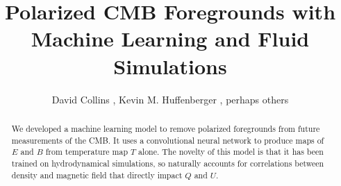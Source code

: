 \title{Polarized CMB Foregrounds with Machine Learning and Fluid Simulations}
\author{David Collins , Kevin M. Huffenberger
, perhaps others}



\begin{abstract}
    We developed a machine learning model to remove polarized foregrounds from
    future measurements of the CMB.  It uses a convolutional neural network to
    produce maps of $E$ and $B$ from temperature map $T$ alone.  The novelty of this model is that it has
    been trained on hydrodynamical simulations, so naturally accounts for
    correlations between density and magnetic field that directly impact $Q$ and
    $U$.  
\end{abstract}

